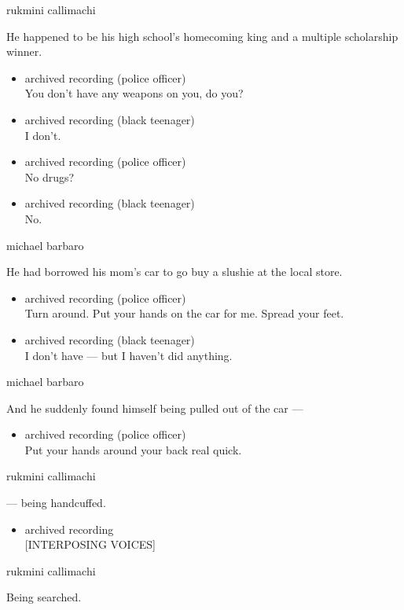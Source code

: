 rukmini callimachi

He happened to be his high school's homecoming king and a multiple
scholarship winner.

\begin{itemize}
\item
  archived recording (police officer)\\
  You don't have any weapons on you, do you?
\item
  archived recording (black teenager)\\
  I don't.
\item
  archived recording (police officer)\\
  No drugs?
\item
  archived recording (black teenager)\\
  No.
\end{itemize}

michael barbaro

He had borrowed his mom's car to go buy a slushie at the local store.

\begin{itemize}
\item
  archived recording (police officer)\\
  Turn around. Put your hands on the car for me. Spread your feet.
\item
  archived recording (black teenager)\\
  I don't have --- but I haven't did anything.
\end{itemize}

michael barbaro

And he suddenly found himself being pulled out of the car ---

\begin{itemize}
\tightlist
\item
  archived recording (police officer)\\
  Put your hands around your back real quick.
\end{itemize}

rukmini callimachi

--- being handcuffed.

\begin{itemize}
\tightlist
\item
  archived recording\\
  {[}INTERPOSING VOICES{]}
\end{itemize}

rukmini callimachi

Being searched.

